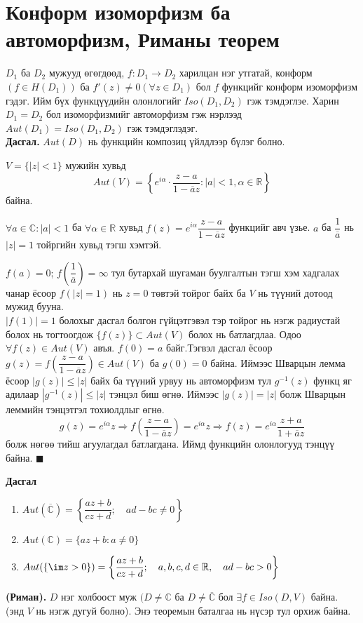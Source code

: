 \section{Конформ изоморфизм ба автоморфизм,
Риманы теорем 
} 
$D_1$ ба $D_2$ мужууд өгөгдөөд, $f:D_1\rightarrow D_2$ харилцан нэг
утгатай, конформ $(f\in H(D_1))$ ба $f'(z)\neq 0(\forall z\in D_1)$ бол $f$
функцийг конформ изоморфизм гэдэг. Ийм бүх функцүүдийн олонлогийг $Iso (D_1, D_2)$ гэж тэмдэглэе. Харин $D_1=D_2$ бол изоморфизмийг автоморфизм  гэж нэрлээд 
$Aut (D_1)=Iso (D_1, D_2)$ гэж тэмдэглэдэг.\\
\textbf{Дасгал.} $Aut (D)$ нь функцийн композиц үйлдлээр бүлэг болно.
\begin{thm}
$V=\{|z|<1\}$ мужийн хувьд
$$Aut (V)=\left\{e^{i\alpha}\cdot \frac{z-a}{1-\overline{a}z}:|a|<1, \alpha\in\mathbb{R}\right\}$$
байна.
\end{thm}
\begin{prf}
$\forall a\in\mathbb{C}:|a|<1$ ба $\forall\alpha\in\mathbb{R}$ хувьд $f(z)=e^{i\alpha}\dfrac{z-a}{1-\overline{a}z}$ функцийг авч үзье. $a$ ба $\dfrac{1}{\overline{a}}$ нь $|z|=1$ тойргийн хувьд тэгш  хэмтэй.

$f(a)=0$; $f\left(\dfrac{1}{\overline{a}}\right)=\infty$ тул бутархай шугаман буулгалтын тэгш хэм хадгалах чанар ёсоор $f(|z|=1)$ нь  $z=0$ төвтэй тойрог байх ба $V$ нь түүний дотоод мужид бууна.\\
$|f(1)|=1$ болохыг дасгал болгон гүйцэтгэвэл тэр тойрог нь нэгж радиустай болох нь тогтоогдож $\{f(z)\}\subset Aut (V)$ болох нь батлагдлаа. Одоо $\forall f(z)\in Aut (V)$ авъя. $f(0)=a$ байг.Тэгвэл дасгал ёсоор $g(z)=f\left(\dfrac{z-a}{1-\overline{a}z}\right) \in Aut (V)$ ба $g(0)=0$ байна. Иймээс Шварцын лемма ёсоор $|g(z)|\leq |z|$ байх ба түүний урвуу нь автоморфизм тул $g^{-1}(z)$ функц яг адилаар $|g^{-1}(z)|\leq |z|$ тэнцэл биш өгнө. Иймээс $|g(z)|=|z|$ болж Шварцын леммийн тэнцэтгэл тохиолдлыг өгнө.
$$g(z)=e^{i\alpha}z\Rightarrow f\left(\frac{z-a}{1-\overline{a}z}\right) =e^{i\alpha}z\Rightarrow f(z)=e^{i\alpha} \frac{z+a}{1+\overline{a}z}$$ болж нөгөө тийш агуулагдал батлагдана. Иймд функцийн олонлогууд тэнцүү байна.
\hfill $\blacksquare$\end{prf}
\begin{center}
    \textbf{Дасгал}
\end{center}
\begin{enumerate}
    \item $Aut (\overline{\mathbb{C}})=\left\{\dfrac{az+b}{cz+d}; \quad ad-bc\neq 0\right\}$
    \item $Aut (\mathbb{C})=\{az+b: a\neq 0\}$
    \item $Aut (\{\im z>0\})=\left\{\dfrac{az+b}{cz+d};\quad a,b,c,d\in \mathbb{R},\quad ad-bc>0\right\}$
\end{enumerate}
\begin{thm}
\textbf{(Риман).} $D$ нэг холбоост муж $(D\neq \mathbb{C}$ ба $D\neq \overline{\mathbb{C}}$ бол $\exists f\in Iso (D,V)$ байна. (энд $V$ нь нэгж дугуй болно). Энэ теоремын баталгаа нь нүсэр тул орхиж байна.
\end{thm}
